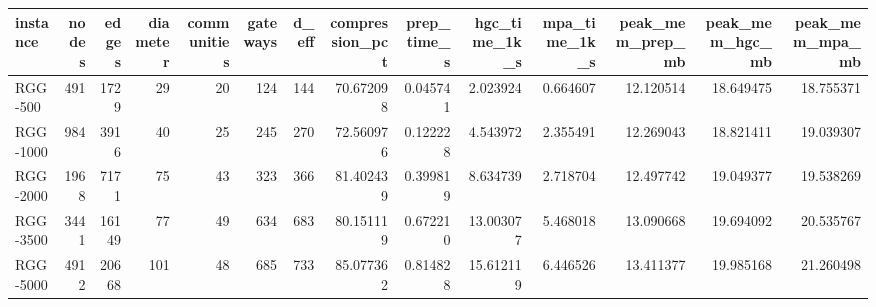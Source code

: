\begin{tabular}{lrrrrrrrrrrrrr}
\toprule
instance & nodes & edges & diameter & communities & gateways & d_eff & compression_pct & prep_time_s & hgc_time_1k_s & mpa_time_1k_s & peak_mem_prep_mb & peak_mem_hgc_mb & peak_mem_mpa_mb \\
\midrule
RGG-500 & 491 & 1729 & 29 & 20 & 124 & 144 & 70.672098 & 0.045741 & 2.023924 & 0.664607 & 12.120514 & 18.649475 & 18.755371 \\
RGG-1000 & 984 & 3916 & 40 & 25 & 245 & 270 & 72.560976 & 0.122228 & 4.543972 & 2.355491 & 12.269043 & 18.821411 & 19.039307 \\
RGG-2000 & 1968 & 7171 & 75 & 43 & 323 & 366 & 81.402439 & 0.399819 & 8.634739 & 2.718704 & 12.497742 & 19.049377 & 19.538269 \\
RGG-3500 & 3441 & 16149 & 77 & 49 & 634 & 683 & 80.151119 & 0.672210 & 13.003077 & 5.468018 & 13.090668 & 19.694092 & 20.535767 \\
RGG-5000 & 4912 & 20668 & 101 & 48 & 685 & 733 & 85.077362 & 0.814828 & 15.612119 & 6.446526 & 13.411377 & 19.985168 & 21.260498 \\
\bottomrule
\end{tabular}
